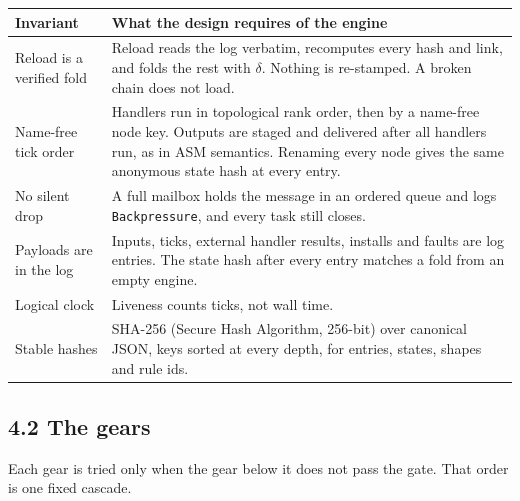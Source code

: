 \documentclass[10pt,letterpaper]{article}
\newcounter{none}
\begin{document}
{\def\LTcaptype{none} %
{\footnotesize\setlength{\tabcolsep}{3.8pt}\renewcommand{\arraystretch}{1.15}
\begin{longtable}[]{@{}
  >{\raggedright\arraybackslash}p{}
  >{\raggedright\arraybackslash}p{}@{}}
\toprule\noalign{}
\begin{minipage}[b]{\linewidth}\raggedright
\textbf{Invariant}
\end{minipage} & \begin{minipage}[b]{\linewidth}\raggedright
\textbf{What the design requires of the engine}
\end{minipage} \\
\midrule\noalign{}
\endhead
\bottomrule\noalign{}
\endlastfoot
Reload is a verified fold & Reload reads the log verbatim, recomputes
every hash and link, and folds the rest with \(\delta\). Nothing is
re-stamped. A broken chain does not load. \\
Name-free tick order & Handlers run in topological rank order, then by a
name-free node key. Outputs are staged and delivered after all handlers
run, as in ASM semantics. Renaming every node gives the same anonymous
state hash at every entry. \\
No silent drop & A full mailbox holds the message in an ordered queue
and logs \texttt{Backpressure}, and every task still closes. \\
Payloads are in the log & Inputs, ticks, external handler results,
installs and faults are log entries. The state hash after every entry
matches a fold from an empty engine. \\
Logical clock & Liveness counts ticks, not wall time. \\
Stable hashes & SHA-256 (Secure Hash Algorithm, 256-bit) over canonical
JSON, keys sorted at every depth, for entries, states, shapes and rule
ids. \\
\end{longtable}
}
}

\subsection{4.2 The gears}\label{the-gears}

Each gear is tried only when the gear below it does not pass the gate.
That order is one fixed cascade.
\end{document}
